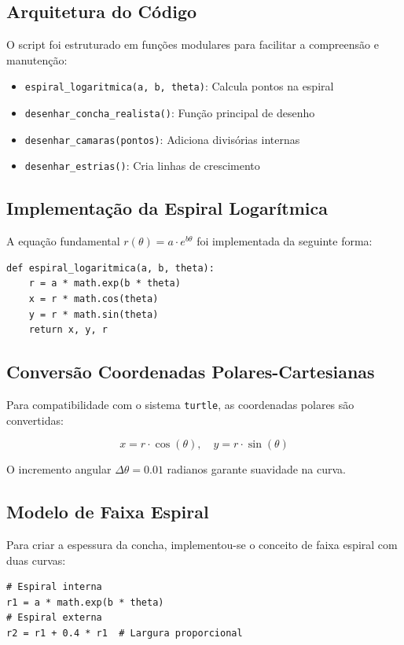 \documentclass[12pt,a4paper,oneside]{extarticle}
\begin{document}
\subsection{Arquitetura do Código}
O script foi estruturado em funções modulares para facilitar a compreensão e manutenção:

\begin{itemize}
    \item \texttt{espiral\_logaritmica(a, b, theta)}: Calcula pontos na espiral
    \item \texttt{desenhar\_concha\_realista()}: Função principal de desenho
    \item \texttt{desenhar\_camaras(pontos)}: Adiciona divisórias internas
    \item \texttt{desenhar\_estrias()}: Cria linhas de crescimento
\end{itemize}

\subsection{Implementação da Espiral Logarítmica}
A equação fundamental $r(\theta) = a \cdot e^{b\theta}$ foi implementada da seguinte forma:

\begin{verbatim}
def espiral_logaritmica(a, b, theta):
    r = a * math.exp(b * theta)
    x = r * math.cos(theta)
    y = r * math.sin(theta)
    return x, y, r
\end{verbatim}

\subsection{Conversão Coordenadas Polares-Cartesianas}
Para compatibilidade com o sistema \texttt{turtle}, as coordenadas polares são convertidas:

\begin{equation}
x = r \cdot \cos(\theta), \quad y = r \cdot \sin(\theta)
\end{equation}

O incremento angular $\Delta\theta = 0.01$ radianos garante suavidade na curva.

\subsection{Modelo de Faixa Espiral}
Para criar a espessura da concha, implementou-se o conceito de faixa espiral com duas curvas:

\begin{verbatim}
# Espiral interna
r1 = a * math.exp(b * theta)
# Espiral externa  
r2 = r1 + 0.4 * r1  # Largura proporcional
\end{verbatim}
\end{document}

